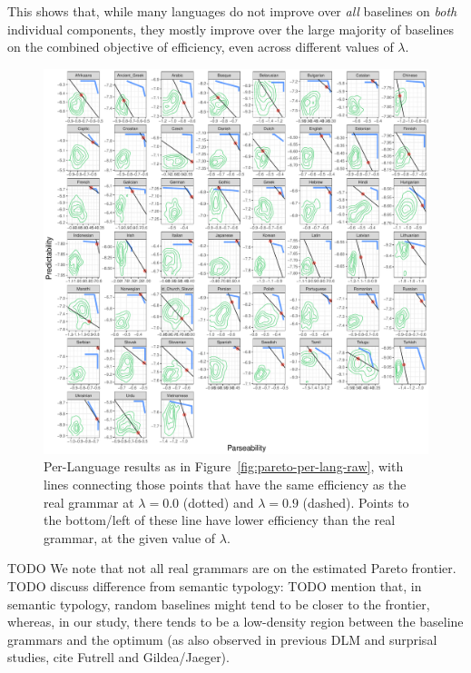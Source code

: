\documentclass[10pt,twoside,lineno]{article}
\begin{document}
This shows that, while many languages do not improve over \emph{all} baselines on \emph{both} individual components, they mostly improve over the large majority of baselines on the combined objective of efficiency, even across different values of $\lambda$.


\begin{figure}
\centering
\includegraphics[width=\textwidth]{../results/plane/analyze_pareto_optimality/pareto-plane-perLanguage-arrows-smoothed-halfspace-untransformed.pdf}
	\caption[]{Per-Language results as in Figure~\ref{fig:pareto-per-lang-raw}, with lines connecting those points that have the same efficiency as the real grammar at $\lambda = 0.0$ (dotted) and $\lambda = 0.9$ (dashed). Points to the bottom/left of these line have lower efficiency than the real grammar, at the given value of $\lambda$.}\label{fig:lambda-halfplane-09}
\end{figure}

TODO
We note that not all real grammars are on the estimated Pareto frontier.
TODO discuss difference from semantic typology:
TODO mention that, in semantic typology, random baselines might tend to be closer to the frontier, whereas, in our study, there tends to be a low-density region between the baseline grammars and the optimum (as also observed in previous DLM and surprisal studies, cite Futrell and Gildea/Jaeger). 
\end{document}
